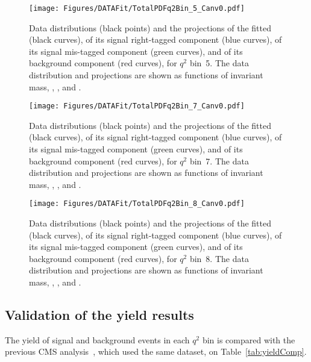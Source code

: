 \begin{figure}[!hbtp]
  \centering
  \texttt{[image: Figures/DATAFit/TotalPDFq2Bin\_5\_Canv0.pdf]}
  \caption{Data distributions (black points) and the projections of the fitted \pdf (black curves), of its signal right-tagged component (blue curves), of its signal mis-tagged component (green curves), and of its background component (red curves), for $q^2$ bin~5.
    The data distribution and \pdf projections are shown as functions of \PBz invariant mass, \cTL, \cTK, and \PHI.}
  \label{fig:res_bin5}
\end{figure}

\begin{figure}
  \centering
  \texttt{[image: Figures/DATAFit/TotalPDFq2Bin\_7\_Canv0.pdf]}
  \caption{Data distributions (black points) and the projections of the fitted \pdf (black curves), of its signal right-tagged component (blue curves), of its signal mis-tagged component (green curves), and of its background component (red curves), for $q^2$ bin~7.
    The data distribution and \pdf projections are shown as functions of \PBz invariant mass, \cTL, \cTK, and \PHI.}
  \label{fig:res_bin7}
\end{figure}

\begin{figure}
  \centering
  \texttt{[image: Figures/DATAFit/TotalPDFq2Bin\_8\_Canv0.pdf]}
  \caption{Data distributions (black points) and the projections of the fitted \pdf (black curves), of its signal right-tagged component (blue curves), of its signal mis-tagged component (green curves), and of its background component (red curves), for $q^2$ bin~8.
    The data distribution and \pdf projections are shown as functions of \PBz invariant mass, \cTL, \cTK, and \PHI.}
  \label{fig:res_bin8}
\end{figure}

\clearpage

\subsection{Validation of the yield results}\label{sec:yieldComp}

The yield of signal and background events in each $q^2$ bin is compared with the previous CMS analysis~\cite{AN-14-129}, which used the same dataset, on Table~\ref{tab:yieldComp}.

